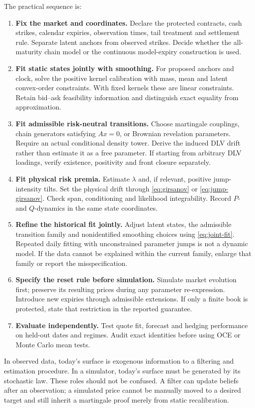 \documentclass[11pt,a4paper]{article}
\numberwithin{equation}{section}
\theoremstyle{definition}\newtheorem{definition}[theorem]{Definition}
\theoremstyle{remark}\newtheorem{remark}[theorem]{Remark}
\begin{document}
The practical sequence is:
\begin{enumerate}[label=\textbf{\arabic*.},leftmargin=*]
\item \textbf{Fix the market and coordinates.} Declare the protected contracts, cash strikes, calendar expiries, observation times, tail treatment and settlement rule. Separate latent anchors from observed strikes. Decide whether the all-maturity chain model or the continuous model-expiry construction is used.
\item \textbf{Fit static states jointly with smoothing.} For proposed anchors and clock, solve the positive kernel calibration with mass, mean and latent convex-order constraints. With fixed kernels these are linear constraints. Retain bid--ask feasibility information and distinguish exact equality from approximation.
\item \textbf{Fit admissible risk-neutral transitions.} Choose martingale couplings, chain generators satisfying $Ax=0$, or Brownian revelation parameters. Require an actual conditional density tower. Derive the induced DLV drift rather than estimate it as a free parameter. If starting from arbitrary DLV loadings, verify existence, positivity and front closure separately.
\item \textbf{Fit physical risk premia.} Estimate $\lambda$ and, if relevant, positive jump-intensity tilts. Set the physical drift through \eqref{eq:girsanov} or \eqref{eq:jump-girsanov}. Check span, conditioning and likelihood integrability. Record $P$- and $Q$-dynamics in the same state coordinates.
\item \textbf{Refine the historical fit jointly.} Adjust latent states, the admissible transition family and nonidentified smoothing choices using \eqref{eq:joint-fit}. Repeated daily fitting with unconstrained parameter jumps is not a dynamic model. If the data cannot be explained within the current family, enlarge that family or report the misspecification.
\item \textbf{Specify the reset rule before simulation.} Simulate market evolution first; preserve its resulting prices during any parameter re-expression. Introduce new expiries through admissible extensions. If only a finite book is protected, state that restriction in the reported guarantee.
\item \textbf{Evaluate independently.} Test quote fit, forecast and hedging performance on held-out dates and regimes. Audit exact identities before using OCE or Monte Carlo mean tests.
\end{enumerate}
In observed data, today's surface is exogenous information to a filtering and estimation procedure. In a simulator, today's surface must be generated by its stochastic law. These roles should not be confused. A filter can update beliefs after an observation; a simulated price cannot be manually moved to a desired target and still inherit a martingale proof merely from static recalibration.
\end{document}
